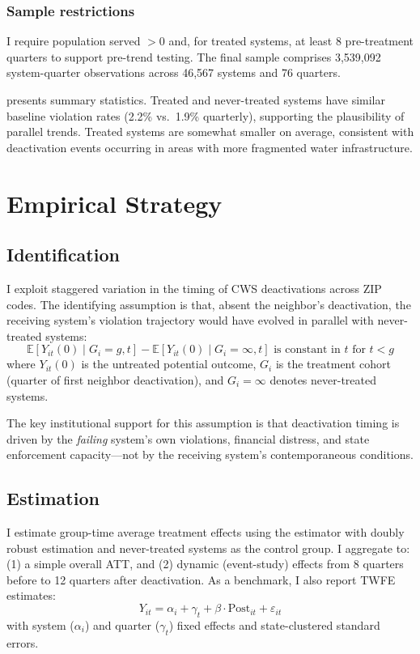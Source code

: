 \documentclass[12pt]{article}
\newcommand{\E}{\mathbb{E}}
\begin{document}
\subsubsection*{Sample restrictions} I require population served $> 0$ and, for treated systems, at least 8 pre-treatment quarters to support pre-trend testing. The final sample comprises 3,539,092 system-quarter observations across 46,567 systems and 76 quarters.



 presents summary statistics. Treated and never-treated systems have similar baseline violation rates (2.2\% vs.\ 1.9\% quarterly), supporting the plausibility of parallel trends. Treated systems are somewhat smaller on average, consistent with deactivation events occurring in areas with more fragmented water infrastructure.


\section{Empirical Strategy}

\subsection{Identification}

I exploit staggered variation in the timing of CWS deactivations across ZIP codes. The identifying assumption is that, absent the neighbor's deactivation, the receiving system's violation trajectory would have evolved in parallel with never-treated systems:
\begin{equation}
\E[Y_{it}(0) \mid G_i = g, t] - \E[Y_{it}(0) \mid G_i = \infty, t] \text{ is constant in } t \text{ for } t < g
\end{equation}
where $Y_{it}(0)$ is the untreated potential outcome, $G_i$ is the treatment cohort (quarter of first neighbor deactivation), and $G_i = \infty$ denotes never-treated systems.

The key institutional support for this assumption is that deactivation timing is driven by the \textit{failing} system's own violations, financial distress, and state enforcement capacity---not by the receiving system's contemporaneous conditions.

\subsection{Estimation}

I estimate group-time average treatment effects using the \citet{callaway2021difference} estimator with doubly robust estimation and never-treated systems as the control group. I aggregate to: (1) a simple overall ATT, and (2) dynamic (event-study) effects from 8 quarters before to 12 quarters after deactivation. As a benchmark, I also report TWFE estimates:
\begin{equation}
Y_{it} = \alpha_i + \gamma_t + \beta \cdot \text{Post}_{it} + \varepsilon_{it}
\end{equation}
with system ($\alpha_i$) and quarter ($\gamma_t$) fixed effects and state-clustered standard errors.
\end{document}
